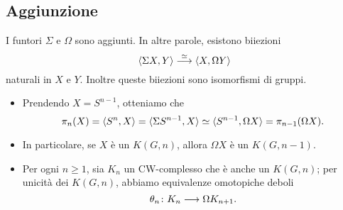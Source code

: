 \subsection*{Aggiunzione}
\begin{frame*}
\begin{proposition}
I funtori $\Sigma$ e $\Omega$ sono aggiunti. In altre parole, esistono biiezioni
\[
\umap[\iso]{\hmaps{\Sigma X,Y}}{\hmaps{X,\Omega Y}}
\]
naturali in $X$ e $Y$. Inoltre queste biiezioni sono isomorfismi di gruppi.
\end{proposition}
\begin{remarks}
\begin{itemize}
\item Prendendo $X=S^{n-1}$, otteniamo che
\[
\pi_n(X)=\langle S^n,X\rangle=\langle \Sigma S^{n-1},X\rangle\simeq\langle S^{n-1},\Omega X\rangle=\pi_{n-1}(\Omega X).
\]
\item In particolare, se $X$ è un $K(G,n)$, allora $\Omega X$ è un $K(G,n-1)$.
\item Per ogni $n\ge 1$, sia $K_n$ un CW-complesso che è anche un $K(G,n)$; per unicità dei $K(G,n)$, abbiamo equivalenze omotopiche deboli
\[
\map{\theta_n}{K_n}{\Omega K_{n+1}}.
\]
\end{itemize}
\end{remarks}
\end{frame*}